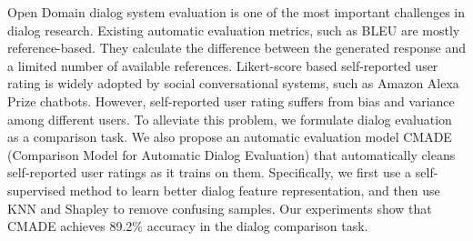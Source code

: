 Open Domain dialog system evaluation is one of the most important challenges in dialog research. Existing automatic evaluation metrics, such as BLEU are mostly reference-based. They calculate the difference between the generated response and a limited number of available references. Likert-score based self-reported user rating is widely adopted by social conversational systems, such as Amazon Alexa Prize chatbots. However, self-reported user rating suffers from bias and variance among different users. To alleviate this problem, we formulate dialog evaluation as a comparison task. We also propose an automatic evaluation model CMADE (Comparison Model for Automatic Dialog Evaluation) that automatically cleans self-reported user ratings as it trains on them. Specifically, we first use a self-supervised method to learn better dialog feature representation, and then use KNN and Shapley to remove confusing samples. Our experiments show that CMADE achieves 89.2\% accuracy in the dialog comparison task.
